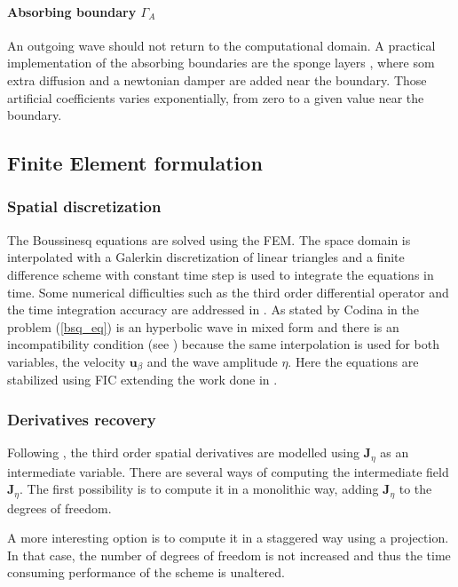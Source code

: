 \paragraph{Absorbing boundary $\Gamma_A$} An outgoing wave should not return to the computational domain. A practical implementation of the absorbing boundaries are the sponge layers \cite{israeli1981, wei1995}, where som extra diffusion and a newtonian damper are added near the boundary. Those artificial coefficients varies exponentially, from zero to a given value near the boundary.



\subsection{Finite Element formulation}

\subsubsection{Spatial discretization}

The Boussinesq equations are solved using the FEM. The space domain is interpolated with a Galerkin discretization of linear triangles and a finite difference scheme with constant time step is used to integrate the equations in time.
Some numerical difficulties such as the third order differential operator and the time integration accuracy are addressed in \cite{walkley2002,woo2004a,wei1995}.
As stated by Codina in \cite{codina2008,codina2008b} the problem (\ref{bsq_eq}) is an hyperbolic wave in mixed form and there is an incompatibility condition (see \cite{BrezziFortin}) because the same interpolation is used for both variables, the velocity $\mathbf{u}_\beta$ and the wave amplitude $\eta$.
Here the equations are stabilized using FIC extending the work done in \cite{maso2022}.


\subsubsection{Derivatives recovery}

Following \cite{walkley2002}, the third order spatial derivatives are modelled using $\mathbf{J}_\eta$ as an intermediate variable. There are several ways of computing the intermediate field $\mathbf{J}_\eta$. The first possibility is to compute it in a monolithic way, adding $\mathbf{J}_\eta$ to the degrees of freedom.

A more interesting option is to compute it in a staggered way using a projection. In that case, the number of degrees of freedom is not increased and thus the time consuming performance of the scheme is unaltered. 


